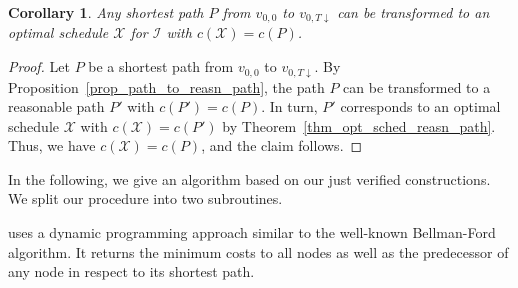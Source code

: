 \documentclass[hidelinks]{article}
\theoremstyle{plain}
\newtheorem{cor}[thm]{Corollary}
\theoremstyle{definition}
\theoremstyle{rem}
\newcommand{\mx}{\mathcal{X}}
\newcommand{\inp}{\mathcal{I}}
\newcommand{\costs}{c}
\begin{document}
\begin{cor}
Any shortest path $P$ from $v_{0,0}$ to $v_{0,T\downarrow}$ can be transformed to an optimal schedule $\mx$ for $\inp$ with $\costs(\mx)=\costs(P)$.
\end{cor}
\begin{proof}
Let $P$ be a shortest path from $v_{0,0}$ to $v_{0,T\downarrow}$. By Proposition~\ref{prop_path_to_reasn_path}, the path $P$ can be transformed to a reasonable path $P'$ with $\costs(P')=\costs(P)$.
In turn, $P'$ corresponds to an optimal schedule $\mx$ with $\costs(\mx)=\costs(P')$ by Theorem~\ref{thm_opt_sched_reasn_path}. Thus, we have $c(\mx)=c(P)$, and the claim follows.
\end{proof}
In the following, we give an algorithm based on our just verified constructions. 
We split our procedure into two subroutines. 

 uses a dynamic programming approach similar to the well-known Bellman-Ford algorithm. It returns the minimum costs to all nodes as well as the predecessor of any node in respect to its shortest path.
\end{document}
